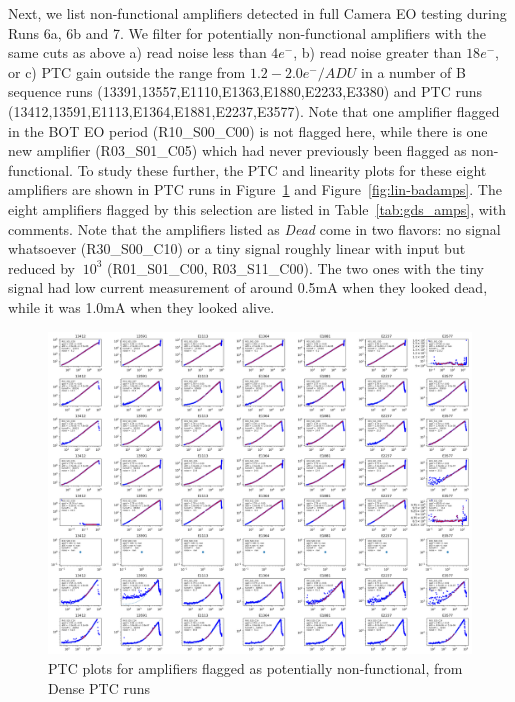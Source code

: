 Next, we list non-functional amplifiers detected in full Camera EO testing during Runs 6a, 6b and 7. We filter for potentially non-functional amplifiers with the same cuts as above a) read noise less than $4e^{-}$, b) read noise greater than $18e^{-}$, or c) PTC gain outside the range from $1.2 - 2.0 e^{-}/ADU$ in a number of B sequence runs (13391,13557,E1110,E1363,E1880,E2233,E3380) and PTC runs (13412,13591,E1113,E1364,E1881,E2237,E3577).  Note that one amplifier flagged in the BOT EO period (R10\_S00\_C00) is not flagged here, while there is one new amplifier (R03\_S01\_C05) which had never previously been flagged as non-functional.  To study these further, the PTC and linearity plots for these eight amplifiers are shown in PTC runs in Figure~\ref{fig:ptc-badamps} and Figure~\ref{fig:lin-badamps}. The eight amplifiers flagged by this selection are listed in Table~\ref{tab:gds_amps}, with comments.  Note that the amplifiers listed as {\it Dead} come in two flavors: no signal whatsoever (R30\_S00\_C10) or a tiny signal roughly linear with input but reduced by $~10^3$ (R01\_S01\_C00, R03\_S11\_C00). The two ones with the tiny signal had low current measurement of around 0.5mA when they looked dead, while it was 1.0mA when they looked alive. 

\begin{figure}
    \centering
    \includegraphics[width=0.95\linewidth]{figures/ptc_badamps.png}
    \caption{PTC plots for amplifiers flagged as potentially non-functional, from Dense PTC runs}
    \label{fig:ptc-badamps}
\end{figure}

